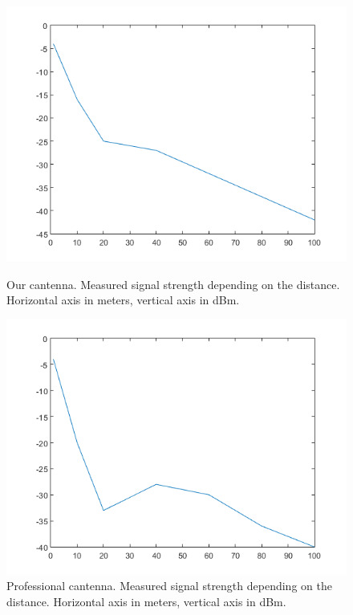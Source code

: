 \begin{figure}\begin{center}
		\includegraphics[width=\figurewidth]{plots/can_p.png}
		\caption{Our cantenna. Measured signal strength depending on the distance. Horizontal axis in meters, vertical axis in dBm.}
		\label{img:dist:pow:can}
		
		\includegraphics[width=\figurewidth]{plots/prof_p.png}
		\caption{Professional cantenna. Measured signal strength depending on the distance. Horizontal axis in meters, vertical axis in dBm.}
		\label{img:dist:pow:prof}
		

\end{center}
\end{figure}

